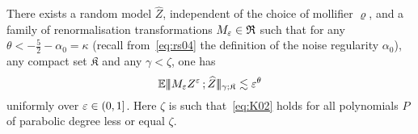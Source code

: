 \documentclass[reqno,11pt]{article}
\def\seminormff#1#2{|\!|\!|#1\,\mathord{;}\,#2|\!|\!|}
\def\fraK{\mathfrak{K}}
\def\Zhat{\widehat Z}
\begin{document}
\begin{prop}
\label{prop:convergence_renorm}
There exists a random model $\Zhat$, independent of the choice of mollifier
$\varrho$, and a family of renormalisation transformations
$M_\varepsilon\in\mathfrak{R}$ such that for any $\theta < -\frac52 -\alpha_0 =
\kappa$ (recall from~\eqref{eq:rs04} the definition of the noise regularity
$\alpha_0$), any compact set $\fraK$ and any $\gamma<\zeta$, one has 
\begin{equation}
 \label{eq:cvr01}
 \E \seminormff{M_\eps Z^\eps}{\Zhat}_{\gamma;\fraK} \lesssim \eps^\theta
\end{equation} 
uniformly over $\varepsilon\in(0,1]$. Here $\zeta$ is such that~\eqref{eq:K02}
holds for all polynomials $P$ of parabolic degree less or equal $\zeta$. 
\end{prop}
%
\end{document}
